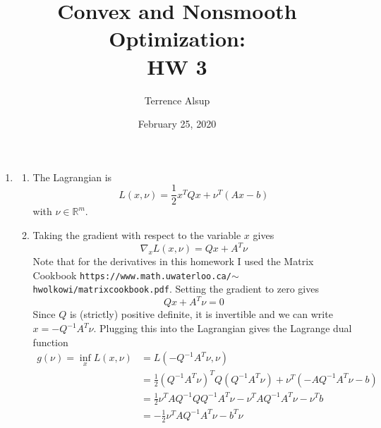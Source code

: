 \documentclass[11pt]{amsart}
\title{Convex and Nonsmooth Optimization:\\HW 3}
\author{Terrence Alsup}
\date{February 25, 2020}
\begin{document}
\maketitle
\begin{enumerate}
\item \begin{enumerate}
\item The Lagrangian is
\[
L(x, \nu) = \frac{1}{2}x^TQx + \nu^T(Ax - b)
\]
with $\nu \in \mathbb{R}^m$.





\item Taking the gradient with respect to the variable $x$ gives
\[
\nabla_x L(x, \nu) = Qx + A^T\nu
\]
Note that for the derivatives in this homework I used the Matrix Cookbook \texttt{https://www.math.uwaterloo.ca/${\sim}$hwolkowi/matrixcookbook.pdf}.  Setting the gradient to zero gives
\[
Qx + A^T\nu = 0
\]
Since $Q$ is (strictly) positive definite, it is invertible and we can write $x = -Q^{-1}A^T\nu$.  Plugging this into the Lagrangian gives the Lagrange dual function
\begin{align*}
g(\nu) = \inf_x L(x, \nu) &= L(-Q^{-1}A^T\nu, \nu)\\
&= \frac{1}{2}(Q^{-1}A^T\nu)^TQ(Q^{-1}A^T\nu) + \nu^T(-AQ^{-1}A^T\nu - b)\\
&= \frac{1}{2}\nu^T A Q^{-1}QQ^{-1}A^T \nu - \nu^TAQ^{-1}A^T\nu - \nu^T b\\
&= -\frac{1}{2} \nu^T  AQ^{-1}A^T \nu - b^T \nu
\end{align*}





\end{enumerate}
\end{enumerate}
\end{document}

